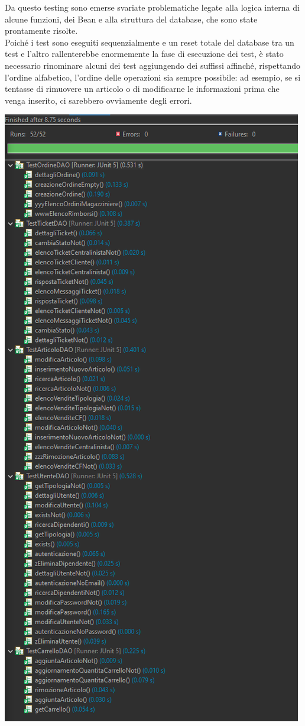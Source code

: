 \documentclass[12pt]{article}
\begin{document}
Da questo testing sono emerse svariate problematiche legate alla logica interna di alcune funzioni, dei Bean e alla struttura del database, che sono state prontamente risolte. \\
Poiché i test sono eseguiti sequenzialmente e un reset totale del database tra un test e l'altro rallenterebbe enormemente la fase di esecuzione dei test, è stato necessario rinominare alcuni dei test aggiungendo dei suffissi affinché, rispettando l'ordine alfabetico, l'ordine delle operazioni sia sempre possibile: ad esempio, se si tentasse di rimuovere un articolo o di modificarne le informazioni prima che venga inserito, ci sarebbero ovviamente degli errori.


\includegraphics[width=\textwidth]{JUnit}
\end{document}
